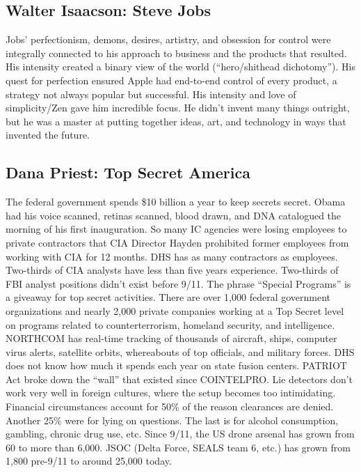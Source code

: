 \documentclass[
]{article}
\begin{document}
\hypertarget{walter-isaacson-steve-jobs}{%
\subsection{Walter Isaacson: Steve
Jobs}\label{walter-isaacson-steve-jobs}}

Jobs' perfectionism, demons, desires, artistry, and obsession for
control were integrally connected to his approach to business and the
products that resulted. His intensity created a binary view of the world
(``hero/shithead dichotomy''). His quest for perfection ensured Apple
had end-to-end control of every product, a strategy not always popular
but successful. His intensity and love of simplicity/Zen gave him
incredible focus. He didn't invent many things outright, but he was a
master at putting together ideas, art, and technology in ways that
invented the future.

\hypertarget{dana-priest-top-secret-america}{%
\subsection{Dana Priest: Top Secret
America}\label{dana-priest-top-secret-america}}

The federal government spends \$10 billion a year to keep secrets
secret. Obama had his voice scanned, retinas scanned, blood drawn, and
DNA catalogued the morning of his first inauguration. So many IC
agencies were losing employees to private contractors that CIA Director
Hayden prohibited former employees from working with CIA for 12 months.
DHS has as many contractors as employees. Two-thirds of CIA analysts
have less than five years experience. Two-thirds of FBI analyst
positions didn't exist before 9/11. The phrase ``Special Programs'' is a
giveaway for top secret activities. There are over 1,000 federal
government organizations and nearly 2,000 private companies working at a
Top Secret level on programs related to counterterrorism, homeland
security, and intelligence. NORTHCOM has real-time tracking of thousands
of aircraft, ships, computer virus alerts, satellite orbits, whereabouts
of top officials, and military forces. DHS does not know how much it
spends each year on state fusion centers. PATRIOT Act broke down the
``wall'' that existed since COINTELPRO. Lie detectors don't work very
well in foreign cultures, where the setup becomes too intimidating.
Financial circumstances account for 50\% of the reason clearances are
denied. Another 25\% were for lying on questions. The last is for
alcohol consumption, gambling, chronic drug use, etc. Since 9/11, the US
drone arsenal has grown from 60 to more than 6,000. JSOC (Delta Force,
SEALS team 6, etc.) has grown from 1,800 pre-9/11 to around 25,000
today.
\end{document}
